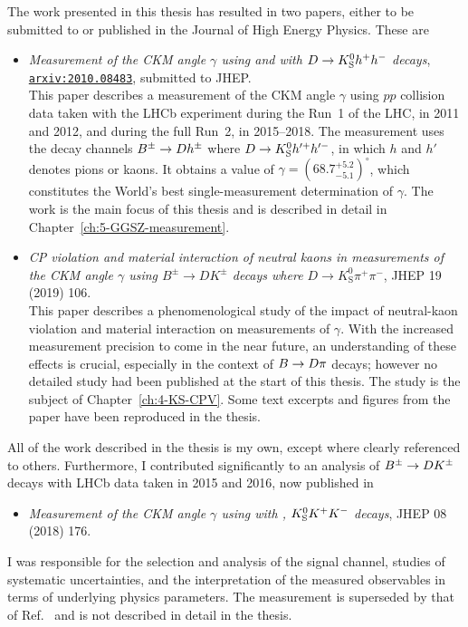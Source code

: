 The work presented in this thesis has resulted in two papers, either to be submitted to or published in the Journal of High Energy Physics. These are
\begin{itemize}

    \item [] \cite{GGSZ-B2Dh} \emph{Measurement of the CKM angle $\gamma$ using \BtoDK and \BtoDpi with ${D}\rightarrow{\ensuremath{{K}^0_{\mathrm{S}}}} h^+ h^-$ decays}, \href{https://arxiv.org/abs/2010.08483}{\nolinkurl{arxiv:2010.08483}}, submitted to JHEP. \\
    This paper describes a measurement of the CKM angle $\gamma$ using $pp$ collision data taken with the LHCb experiment during the Run~1 of the LHC, in 2011 and 2012, and during the full Run~2, in 2015--2018. The measurement uses the decay channels ${{B}^\pm}\rightarrow{\ensuremath{D}} h^\pm$ where ${D}\rightarrow{\ensuremath{{K}^0_{\mathrm{S}}}} h'^+h'^-$, in which $h$ and $h'$ denotes pions or kaons. It obtains a value of $\gamma= (68.7^{+5.2}_{-5.1})^\circ$, which constitutes the World's best single-measurement determination of $\gamma$. The work is the main focus of this thesis and is described in detail in Chapter~\ref{ch:5-GGSZ-measurement}.

    \item [] \cite{KsCPV} \emph{CP violation and material interaction of neutral kaons in measurements of the CKM angle $\gamma$ using $B^\pm\to
    DK^\pm$ decays where $D\to K_\text{S}^0\pi^+\pi^-$}, JHEP 19 (2019) 106. \\
                        This paper describes a phenomenological study of the impact of neutral-kaon \CP violation and material interaction on measurements of $\gamma$. With the increased measurement precision to come in the near future, an understanding of these effects is crucial, especially in the context of ${B}\rightarrow{\ensuremath{D}}\pi$ decays; however no detailed study had been published at the start of this thesis. The study is the subject of Chapter~\ref{ch:4-KS-CPV}. Some text excerpts and figures from the paper have been reproduced in the thesis.
\end{itemize}
All of the work described in the thesis is my own, except where clearly referenced to others. Furthermore, I contributed significantly to an analysis of ${{B}^\pm}\rightarrow{\ensuremath{D}}{\ensuremath{{K}^\pm}}$ decays with LHCb data taken in 2015 and 2016, now published in
\begin{itemize}
    \item [] \cite{LHCb-PAPER-2018-017} \emph{Measurement of the CKM angle $\gamma$ using  with , ${{K}^0_{\mathrm{S}}} K^+K^-$ decays}, JHEP 08 (2018) 176.
\end{itemize}
I was responsible for the selection and analysis of the signal channel, studies of systematic uncertainties, and the interpretation of the measured observables in terms of underlying physics parameters. The measurement is superseded by that of Ref.~\cite{GGSZ-B2Dh} and is not described in detail in the thesis.

